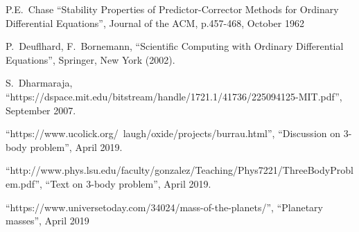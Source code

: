 \documentclass[12pt, twoside]{report}
\theoremstyle{plain}
\theoremstyle{definition}
\theoremstyle{definition}
\begin{document}
\begin{thebibliography}{50}
        P.E.~Chase
        ``Stability Properties of Predictor-Corrector Methods for Ordinary 
        Differential Equations'',
        Journal of the ACM, p.457-468, October 1962

        P.~Deuflhard, F.~Bornemann,
        ``Scientific Computing with Ordinary Differential Equations'',
        Springer, New York (2002).

        S.~Dharmaraja,
        ``https://dspace.mit.edu/bitstream/handle/1721.1/41736/225094125-MIT.pdf'',
        September 2007.

        ``https://www.ucolick.org/~laugh/oxide/projects/burrau.html'',
        ``Discussion on 3-body problem'',
        April 2019.

        ``http://www.phys.lsu.edu/faculty/gonzalez/Teaching/Phys7221/ThreeBodyProblem.pdf'',
        ``Text on 3-body problem'',
        April 2019.


        ``https://www.universetoday.com/34024/mass-of-the-planets/'',
        ``Planetary masses'',
        April 2019

\end{thebibliography}
\end{document}
